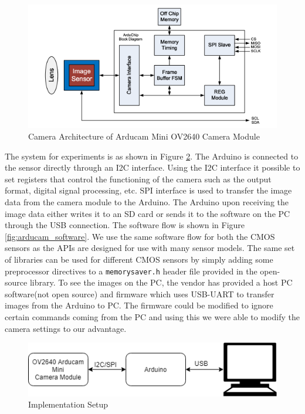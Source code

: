  \begin{figure}[!htbp]
\centering
\includegraphics[width = \textwidth]{pics/arducam_architecture}
\caption{Camera Architecture of Arducam Mini OV2640 Camera Module\cite{OV5642Arducam}}
\label{fig:arducam_arch}
\end{figure}

The system for experiments is as shown in Figure \ref{fig:imp_setup}. The Arduino is connected to the sensor directly through an I2C interface. Using the I2C interface it possible to set registers that control the functioning of the camera such as the output format, digital signal processing, etc. SPI interface is used to transfer the image data from the camera module to the Arduino. The Arduino upon receiving the image data either writes it to an  SD card or sends it to the software on the PC through the USB connection. The software flow is shown in Figure \ref{fig:arducam_software}. We use the same software flow for both the CMOS sensors as the APIs are designed for use with many sensor models. The same set of libraries can be used for different CMOS sensors by simply adding some preprocessor directives to a \texttt{memorysaver.h} header file provided in the open-source library. To see the images on the PC, the vendor has provided a host PC software(not open source) and firmware which uses USB-UART to transfer images from the Arduino to PC. The firmware could be modified to ignore certain commands coming from the PC and using this we were able to modify the camera settings to our advantage. 
\begin{figure}[!htbp]
\centering
\includegraphics[scale=0.75]{pics/implementation_setup}
\caption{Implementation Setup}
\label{fig:imp_setup}
\end{figure}

